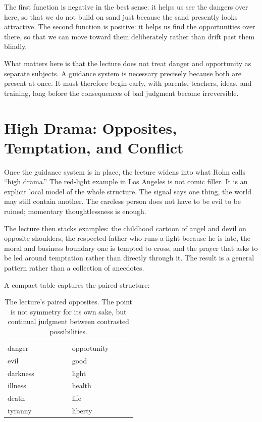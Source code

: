 The first function is negative in the best sense: it helps us see the dangers over here, so that we do not build on sand just because the sand presently looks attractive. The second function is positive: it helps us find the opportunities over there, so that we can move toward them deliberately rather than drift past them blindly.

What matters here is that the lecture does not treat danger and opportunity as separate subjects. A guidance system is necessary precisely because both are present at once. It must therefore begin early, with parents, teachers, ideas, and training, long before the consequences of bad judgment become irreversible.

\section{High Drama: Opposites, Temptation, and Conflict}

Once the guidance system is in place, the lecture widens into what Rohn calls ``high drama.'' The red-light example in Los Angeles is not comic filler. It is an explicit local model of the whole structure. The signal says one thing, the world may still contain another. The careless person does not have to be evil to be ruined; momentary thoughtlessness is enough.

The lecture then stacks examples: the childhood cartoon of angel and devil on opposite shoulders, the respected father who runs a light because he is late, the moral and business boundary one is tempted to cross, and the prayer that asks to be led around temptation rather than directly through it. The result is a general pattern rather than a collection of anecdotes.

A compact table captures the paired structure:
\begin{table}[h]
\centering
\begin{tabular}{p{0.34\linewidth} p{0.34\linewidth}}
danger & opportunity \\
evil & good \\
darkness & light \\
illness & health \\
death & life \\
tyranny & liberty
\end{tabular}
\caption{The lecture's paired opposites. The point is not symmetry for its own sake, but continual judgment between contrasted possibilities.}
\end{table}


